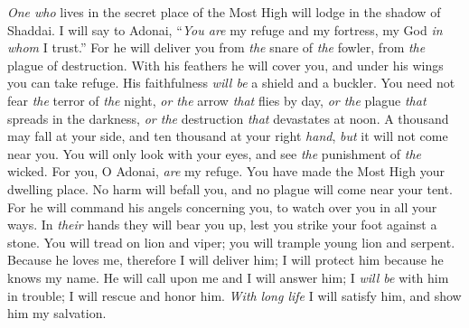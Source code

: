 \begin{biblechapter} %
 \textit{One who} lives in the secret place of the Most High 
will lodge in the shadow of Shaddai.
\verse I will say to Adonai, “\textit{You are} my refuge and my fortress, 
my God \textit{in whom} I trust.”
\verse For he will deliver you from \textit{the} snare of \textit{the} fowler, 
from \textit{the} plague of destruction.
\verse With his feathers he will cover you, 
and under his wings you can take refuge. 
His faithfulness \textit{will be} a shield and a buckler.
\verse You need not fear \textit{the} terror of \textit{the} night, 
\textit{or the} arrow \textit{that} flies by day,
\verse \textit{or the} plague \textit{that} spreads in the darkness, 
\textit{or the} destruction \textit{that} devastates at noon.
\verse A thousand may fall at your side, 
and ten thousand at your right \textit{hand}, 
\textit{but} it will not come near you.
\verse You will only look with your eyes, 
and see \textit{the} punishment of \textit{the} wicked.
\verse For you, O Adonai, \textit{are} my refuge. 
You have made the Most High your dwelling place.
\verse No harm will befall you, 
and no plague will come near your tent.
\verse For he will command his angels concerning you, 
to watch over you in all your ways.
\verse In \textit{their} hands they will bear you up, 
lest you strike your foot against a stone.
\verse You will tread on lion and viper; 
you will trample young lion and serpent.
\verse Because he loves me, therefore I will deliver him; 
I will protect him because he knows my name.
\verse He will call upon me and I will answer him; 
I \textit{will be} with him in trouble; 
I will rescue and honor him.
\verse \textit{With} \textit{long life} I will satisfy him, 
and show him my salvation.
\end{biblechapter}

